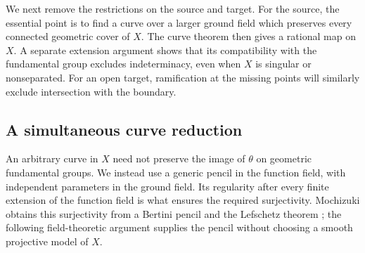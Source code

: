 \documentclass[11pt,a4paper]{article}
\numberwithin{equation}{section}
\theoremstyle{plain}
\theoremstyle{definition}
\theoremstyle{remark}
\begin{document}
We next remove the restrictions on the source and target. For the source,
the essential point is to find a curve over a larger ground field which
preserves every connected geometric cover of $X$. The curve theorem
then gives a rational map on $X$. A separate extension argument shows
that its compatibility with the fundamental group excludes
indeterminacy, even when $X$ is singular or nonseparated. For an open
target, ramification at the missing points will similarly exclude
intersection with the boundary.

\subsection{A simultaneous curve reduction}

An arbitrary curve in $X$ need not preserve the image of $\theta$ on
geometric fundamental groups. We instead use a generic pencil in the
function field, with independent parameters in the ground field. Its
regularity after every finite extension of the function field is what
ensures the required surjectivity. Mochizuki obtains this surjectivity
from a Bertini pencil and the Lefschetz theorem
\cite[Lemmas~16.1--16.2]{Mochizuki1999}; the following field-theoretic
argument supplies the pencil without choosing a smooth projective
model of $X$.
\end{document}
